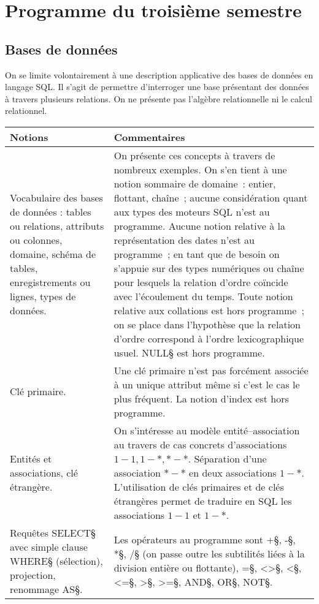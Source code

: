 \section{Programme du troisième semestre}

\subsection{Bases de données}

On se limite volontairement à une description applicative des bases
de données en langage SQL. Il s'agit de permettre d'interroger une base présentant des données
à travers plusieurs relations. On ne présente pas l'algèbre relationnelle ni le
calcul relationnel. 

\noindent
\begin{longtable}{|p{\lnotion}|p{\comment}|}
    \hline
    \textbf{Notions} & \textbf{Commentaires} \\
    \hline \hline
     Vocabulaire des bases de données : tables ou relations, attributs ou colonnes, domaine, schéma de tables, enregistrements ou lignes, types de données.&
     On présente ces concepts à travers de
    nombreux exemples. On s'en tient à une notion sommaire de domaine~: entier, flottant, chaîne~; aucune considération quant aux types des moteurs SQL n'est au programme. Aucune notion relative à la représentation des dates n'est au programme~; en tant que de besoin on s'appuie sur des types numériques ou chaîne pour lesquels la relation d'ordre coïncide avec l'écoulement du temps. Toute notion relative aux collations est hors programme~; on se place dans l'hypothèse que la relation d'ordre correspond à l'ordre lexicographique usuel. \§NULL§ est hors programme.\\ \hline

    Clé primaire. & Une clé primaire n'est pas forcément associée à un unique
    attribut même si c'est le cas le plus fréquent. La notion d'index est hors
    programme.
    \\ \hline
 Entités et associations, clé étrangère. &
    On s'intéresse au modèle entité--association au travers de cas
    concrets d'associations $1-1, 1-*, *-*$.
    Séparation d'une association $*-*$ en deux associations $1-*$. L'utilisation
    de clés primaires et de clés étrangères permet de traduire en SQL les
    associations $1-1$ et $1-*$.\\ \hline

    Requêtes \§SELECT§ avec simple clause \§WHERE§ (sélection), projection, renommage \§AS§. 
    & 
    Les opérateurs au programme sont \§+§, \§-§, \§*§, \§/§ (on passe outre les subtilités liées à la division entière ou flottante), \§=§, \§<>§, \§<§, \§<=§, \§>§, \§>=§, \§AND§, \§OR§, \§NOT§.\\
    

\end{longtable}

